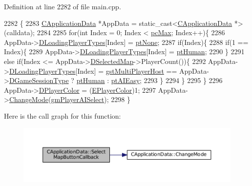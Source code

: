 Definition at line 2282 of file main.\+cpp.


\begin{DoxyCode}
2282                                                             \{
2283     \hyperlink{classCApplicationData}{CApplicationData} *AppData = \textcolor{keyword}{static\_cast<}\hyperlink{classCApplicationData}{CApplicationData} *\textcolor{keyword}{>}(calldata);
2284  
2285     \textcolor{keywordflow}{for}(\textcolor{keywordtype}{int} Index = 0; Index < \hyperlink{GameDataTypes_8h_aafb0ca75933357ff28a6d7efbdd7602fa594a5c8dd3987f24e8a0f23f1a72cd34}{pcMax}; Index++)\{
2286         AppData->\hyperlink{classCApplicationData_a2ac5711b027842d57aa5f8e5a7adc589}{DLoadingPlayerTypes}[Index] = \hyperlink{classCApplicationData_ae04b6b340297311972ce1e955196fcaaa091de1adaa447ed15f9f6bb25f0880f7}{ptNone};
2287         \textcolor{keywordflow}{if}(Index)\{
2288             \textcolor{keywordflow}{if}(1 == Index)\{
2289                 AppData->\hyperlink{classCApplicationData_a2ac5711b027842d57aa5f8e5a7adc589}{DLoadingPlayerTypes}[Index] = \hyperlink{classCApplicationData_ae04b6b340297311972ce1e955196fcaaaf06f9bc64db8860bc03ecc330b11f234}{ptHuman};
2290             \}
2291             \textcolor{keywordflow}{else} \textcolor{keywordflow}{if}(Index <= AppData->\hyperlink{classCApplicationData_abf74a18394e479b7090a8f9a55608867}{DSelectedMap}->PlayerCount())\{
2292                 AppData->\hyperlink{classCApplicationData_a2ac5711b027842d57aa5f8e5a7adc589}{DLoadingPlayerTypes}[Index] = 
      \hyperlink{classCApplicationData_a0ec00515bf6b4b469b43ad62d615e3faa9ce51c30b802a2fc5f1c587829b20673}{gstMultiPlayerHost} == AppData->\hyperlink{classCApplicationData_acd2cc6f5bbb325532c21afc38241c3de}{DGameSessionType} ?  
      \hyperlink{classCApplicationData_ae04b6b340297311972ce1e955196fcaaaf06f9bc64db8860bc03ecc330b11f234}{ptHuman} : \hyperlink{classCApplicationData_ae04b6b340297311972ce1e955196fcaaa94da5a073589347212dc8f08c02a17a5}{ptAIEasy};
2293             \}
2294         \}
2295     \}
2296     AppData->\hyperlink{classCApplicationData_a53550939b20cba70570f113e4d1c5d02}{DPlayerColor} = (\hyperlink{GameDataTypes_8h_aafb0ca75933357ff28a6d7efbdd7602f}{EPlayerColor})1;
2297     AppData->\hyperlink{classCApplicationData_aee18c113e9a0acb3cad3d63eb19de71b}{ChangeMode}(\hyperlink{classCApplicationData_ac8ac37a4c8bb871036fbbdc6a072e403a01258bbe3c3588b79ba150d1106b34b9}{gmPlayerAISelect});
2298 \}
\end{DoxyCode}
Here is the call graph for this function\+:
\nopagebreak
\begin{figure}[H]
\begin{center}
\leavevmode
\includegraphics[width=350pt]{classCApplicationData_a5f915dc03205b67ca79f4dcfd7b43f5a_cgraph}
\end{center}
\end{figure}
